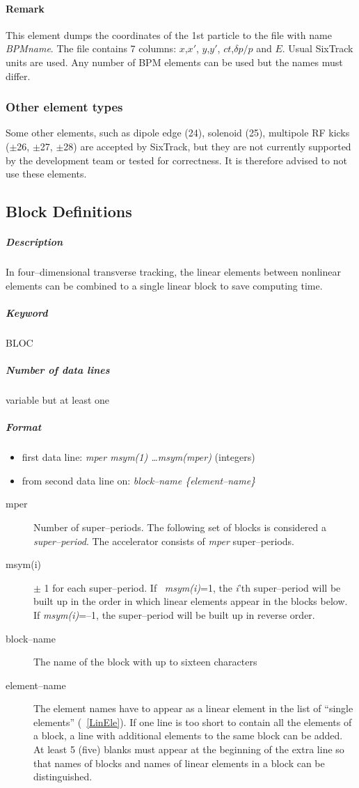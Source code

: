 \documentclass[a4paper,11pt]{report}
\begin{document}
\paragraph{Remark}
This element dumps the coordinates of the 1st particle to the file with name {\em BPMname}.
The file contains 7 columns: $x$,$x'$, $y$,$y'$, $ct$,$\delta p/p$ and $E$.
Usual SixTrack units are used. Any number of BPM elements can be used but
the names must differ. 




\subsubsection{Other element types}

Some other elements, such as dipole edge (24), solenoid (25), multipole RF kicks ($\pm$26, $\pm$27, $\pm$28) are accepted by SixTrack, but they are not currently supported by the development team or tested for correctness.
It is therefore advised to not use these elements.

\subsection{Block Definitions} \label{BloDef}

\subparagraph{Description} In four--dimensional transverse tracking,
the linear elements between nonlinear elements can be combined to a
single linear block to save computing time.

\subparagraph{Keyword} BLOC \subparagraph{Number of data lines}
variable but at least one

\subparagraph{Format}
\begin{itemize}
\item first data line: {\em mper msym(1) \dots msym(mper)}
  \/(integers)
\item from second data line on: {\em block--name \{element--name\} }
\end{itemize}

\begin{description}
\item [mper] Number of super--periods. The following set of blocks is
  considered a {\em super--period}\/. The accelerator consists of {\em
    mper} \/super--periods.
\item [msym(i)] $\pm$ 1 for each super--period.  If \mbox{{\em
      msym(i)}=1,} \/the \mbox{{\em i}\/'th} super--period will be
  built up in the order in which linear elements appear in the blocks
  below. If {\em msym(i)}\/=--1, the super--period will be built up in
  reverse order.
\item [block--name] The name of the block with up to sixteen
  characters
\item [element--name] The element names have to appear as a linear
  element in the list of ``single elements'' (~\ref{LinEle}). If one
  line is too short to contain all the elements of a block, a line
  with additional elements to the same block can be added.  At least 5
  (five) blanks must appear at the beginning of the extra line so that
  names of blocks and names of linear elements in a block can be
  distinguished.
\end{description}
\end{document}
